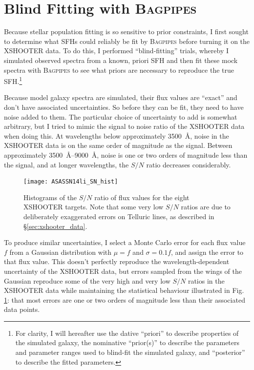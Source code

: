 \documentclass[a4paper,11pt]{article}
\begin{document}
\section{Blind Fitting with \textsc{Bagpipes}}\label{sec:blind_fitting}

Because stellar population fitting is so sensitive to prior constraints, I first sought to determine what SFHs could reliably be fit by \textsc{Bagpipes} before turning it on the XSHOOTER data. To do this, I performed ``blind-fitting'' trials, whereby I simulated observed spectra from a known, priori SFH and then fit these mock spectra with \textsc{Bagpipes} to see what priors are necessary to reproduce the true SFH.\footnote{For clarity, I will hereafter use the dative ``priori'' to describe properties of the simulated galaxy, the nominative ``prior(s)'' to describe the parameters and parameter ranges used to blind-fit the simulated galaxy, and ``posterior'' to describe the fitted parameters.}

Because model galaxy spectra are simulated, their flux values are ``exact'' and don't have associated uncertainties. So before they can be fit, they need to have noise added to them. The particular choice of uncertainty to add is somewhat arbitrary, but I tried to mimic the signal to noise ratio of the XSHOOTER data when doing this. At wavelengths below approximately \SI{3500}{\angstrom}, noise in the XSHOOTER data is on the same order of magnitude as the signal. Between approximately \SIrange{3500}{9000}{\angstrom}, noise is one or two orders of magnitude less than the signal, and at longer wavelengths, the $S/N$ ratio decreases considerably.

\begin{figure}
  \texttt{[image: ASASSN14li\_SN\_hist]}
  \caption{Histograms of the $S/N$ ratio of flux values for the eight XSHOOTER targets. Note that some very low $S/N$ ratios are due to deliberately exaggerated errors on Telluric lines, as described in \S \ref{sec:xshooter_data}.}
  \label{fig:sig_to_noise_histograms}
\end{figure}

To produce similar uncertainties, I select a Monte Carlo error for each flux value $f$ from a Gaussian distribution with $\mu=f$ and $\sigma=0.1f$, and assign the error to that flux value. This doesn't perfectly reproduce the wavelength-dependent uncertainty of the XSHOOTER data, but errors sampled from the wings of the Gaussian reproduce some of the very high and very low $S/N$ ratios in the XSHOOTER data while maintaining the statistical behaviour illustrated in Fig. \ref{fig:sig_to_noise_histograms}: that most errors are one or two orders of magnitude less than their associated data points.
\end{document}
